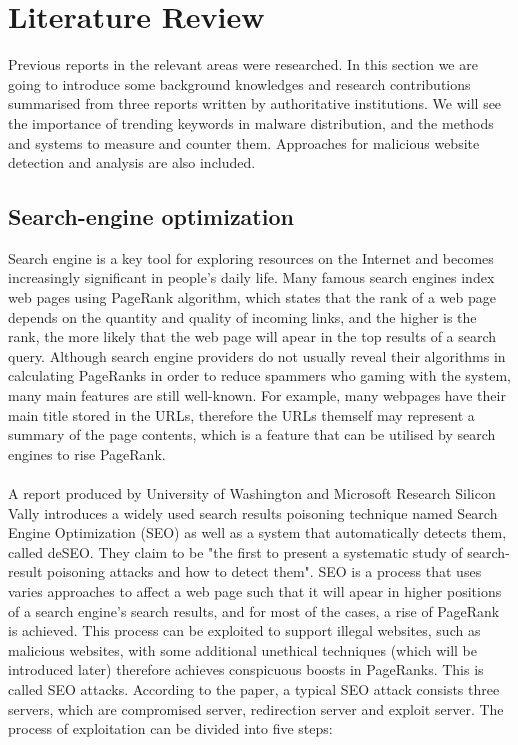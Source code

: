 \section{Literature Review}

Previous reports in the relevant areas were researched. In this section we are
going to introduce some background knowledges and research contributions
summarised from three reports written by authoritative institutions. We will
see the importance of trending keywords in malware distribution, and the
methods and systems to measure and counter them. Approaches for malicious
website detection and analysis are also included. 

\subsection{Search-engine optimization} 

Search engine is a key tool for
exploring resources on the Internet and becomes increasingly significant in
people's daily life. Many famous search engines index web pages using PageRank
algorithm, which states that the rank of a web page depends on the quantity and
quality of incoming links, and the higher is the rank, the more likely that the
web page will apear in the top results of a search query. Although search
engine providers do not usually reveal their algorithms in calculating
PageRanks in order to reduce spammers who gaming with the system, many main
features are still well-known. For example, many webpages have their main title
stored in the URLs, therefore the URLs themself may represent a summary of the
page contents, which is a feature that can be utilised by search engines to
rise PageRank.
\paragraph{}
A report produced by University of Washington and Microsoft
Research Silicon Vally introduces a widely used search results poisoning
technique named Search Engine Optimization (SEO) as well as a system that
automatically detects them, called deSEO.\cite{deseo} They claim to be "the
first to present a systematic study of search-result poisoning attacks and how
to detect them". SEO is a process that uses varies approaches to affect a web
page such that it will apear in higher positions of a search engine's search
results, and for most of the cases, a rise of PageRank is achieved. This
process can be exploited to support illegal websites, such as malicious
websites, with some additional unethical techniques (which will be introduced
later) therefore achieves conspicuous boosts in PageRanks. This is called SEO
attacks. According to the paper, a typical SEO attack consists three servers,
which are compromised server, redirection server and exploit server. The
process of exploitation can be divided into five steps: 
